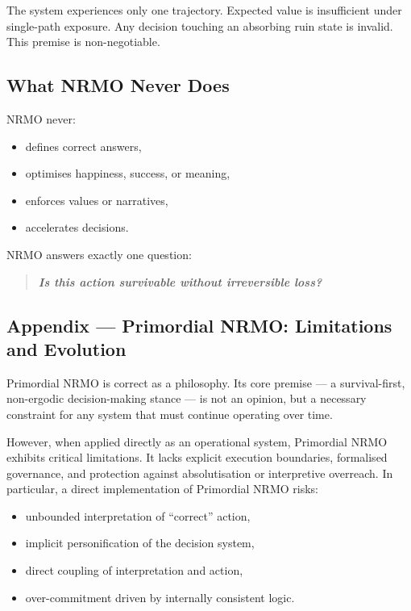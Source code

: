 The system experiences only one trajectory. Expected value is
insufficient under single-path exposure. Any decision touching an
absorbing ruin state is invalid. This premise is non-negotiable.

\subsection{What NRMO Never Does}
\label{sec:primordial-never}

NRMO never:

\begin{itemize}
\item defines correct answers,
\item optimises happiness, success, or meaning,
\item enforces values or narratives,
\item accelerates decisions.
\end{itemize}

\noindent
NRMO answers exactly one question:

\begin{quote}
\centering
\textit{\textbf{Is this action survivable without irreversible loss?}}
\end{quote}

\subsection*{Appendix --- Primordial NRMO: Limitations and Evolution}
\label{sec:primordial-limitations}

Primordial NRMO is correct as a philosophy. Its core premise --- a
survival-first, non-ergodic decision-making stance --- is not an
opinion, but a necessary constraint for any system that must continue
operating over time.

However, when applied directly as an operational system, Primordial
NRMO exhibits critical limitations. It lacks explicit execution
boundaries, formalised governance, and protection against
absolutisation or interpretive overreach. In particular, a direct
implementation of Primordial NRMO risks:

\begin{itemize}
\item unbounded interpretation of ``correct'' action,
\item implicit personification of the decision system,
\item direct coupling of interpretation and action,
\item over-commitment driven by internally consistent logic.
\end{itemize}

